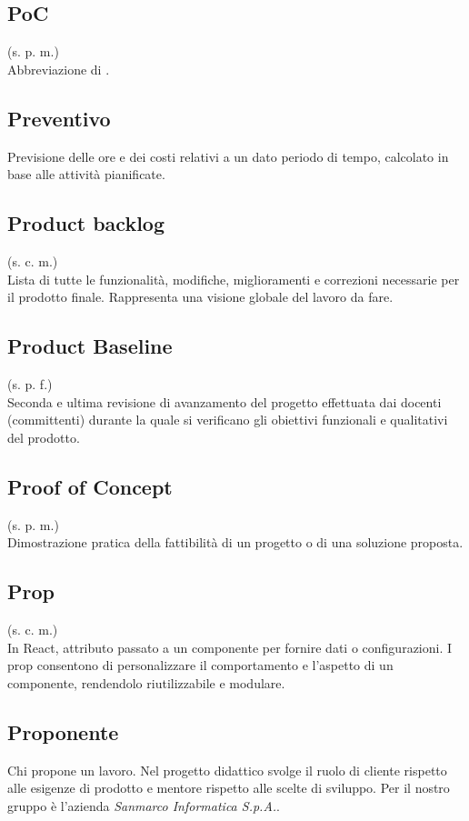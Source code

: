 \subsection{PoC}
(s. p. m.)\\
Abbreviazione di .
\subsection{Preventivo}
Previsione delle ore e dei costi relativi a un dato periodo di tempo, calcolato
in base alle attività pianificate.
\subsection{Product backlog}
\label{Product backlog}
(s. c. m.)\\
Lista di tutte le funzionalità, modifiche, miglioramenti e correzioni necessarie
per il prodotto finale. Rappresenta una visione globale del lavoro da fare.
\subsection{Product Baseline}
\label{Product Baseline}
(s. p. f.)\\
Seconda e ultima revisione di avanzamento del progetto effettuata dai docenti (committenti)
durante la quale si verificano gli obiettivi funzionali e qualitativi del prodotto.
\subsection{Proof of Concept}
\label{Proof of Concept}
(s. p. m.)\\
Dimostrazione pratica della fattibilità di un progetto o di una soluzione proposta.
\subsection{Prop}
(s. c. m.)\\
In React, attributo passato a un componente per fornire dati o configurazioni.
I prop consentono di personalizzare il comportamento e l'aspetto
di un componente, rendendolo riutilizzabile e modulare.
\subsection{Proponente}
\label{Proponente}
Chi propone un lavoro. Nel progetto didattico svolge il ruolo di cliente
rispetto alle esigenze di prodotto e mentore rispetto alle scelte di sviluppo.
Per il nostro gruppo è l'azienda \textit{Sanmarco Informatica S.p.A.}.
